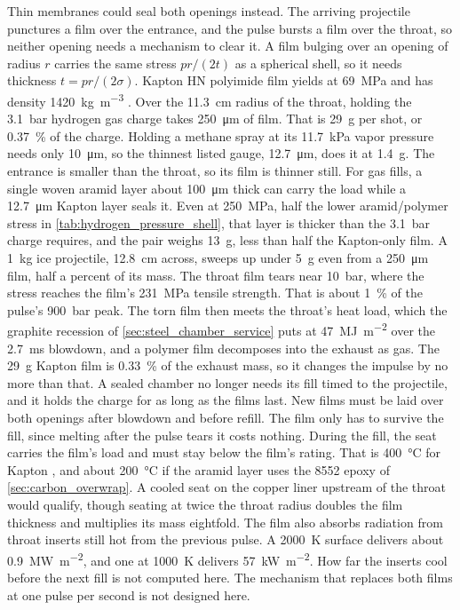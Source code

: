 \documentclass{article}
\begin{document}
Thin membranes could seal both openings instead. The arriving projectile punctures a film over the entrance, and the pulse bursts a film over the throat, so neither opening needs a mechanism to clear it. A film bulging over an opening of radius $r$ carries the same stress $pr/(2t)$ as a spherical shell, so it needs thickness $t=pr/(2\sigma)$. Kapton HN polyimide film yields at \SI{69}{\mega\pascal} and has density \SI{1420}{\kilogram\per\cubic\meter} \cite{dupont_kapton_hn_datasheet}. Over the \SI{11.3}{\centi\meter} radius of the throat, holding the \SI{3.1}{\bar} hydrogen gas charge takes \SI{250}{\micro\meter} of film. That is \SI{29}{\gram} per shot, or \SI{0.37}{\percent} of the charge. Holding a methane spray at its \SI{11.7}{\kilo\pascal} vapor pressure needs only \SI{10}{\micro\meter}, so the thinnest listed gauge, \SI{12.7}{\micro\meter}, does it at \SI{1.4}{\gram}. The entrance is smaller than the throat, so its film is thinner still. For gas fills, a single woven aramid layer about \SI{100}{\micro\meter} thick can carry the load while a \SI{12.7}{\micro\meter} Kapton layer seals it. Even at \SI{250}{\mega\pascal}, half the lower aramid/polymer stress in \autoref{tab:hydrogen_pressure_shell}, that layer is thicker than the \SI{3.1}{\bar} charge requires, and the pair weighs \SI{13}{\gram}, less than half the Kapton-only film. A \SI{1}{\kilogram} ice projectile, \SI{12.8}{\centi\meter} across, sweeps up under \SI{5}{\gram} even from a \SI{250}{\micro\meter} film, half a percent of its mass. The throat film tears near \SI{10}{\bar}, where the stress reaches the film's \SI{231}{\mega\pascal} tensile strength. That is about \SI{1}{\percent} of the pulse's \SI{900}{\bar} peak. The torn film then meets the throat's heat load, which the graphite recession of \autoref{sec:steel_chamber_service} puts at \SI{47}{\mega\joule\per\square\meter} over the \SI{2.7}{\milli\second} blowdown, and a polymer film decomposes into the exhaust as gas. The \SI{29}{\gram} Kapton film is \SI{0.33}{\percent} of the exhaust mass, so it changes the impulse by no more than that. A sealed chamber no longer needs its fill timed to the projectile, and it holds the charge for as long as the films last. New films must be laid over both openings after blowdown and before refill. The film only has to survive the fill, since melting after the pulse tears it costs nothing. During the fill, the seat carries the film's load and must stay below the film's rating. That is \SI{400}{\celsius} for Kapton \cite{dupont_kapton_hn_datasheet}, and about \SI{200}{\celsius} if the aramid layer uses the 8552 epoxy of \autoref{sec:carbon_overwrap}. A cooled seat on the copper liner upstream of the throat would qualify, though seating at twice the throat radius doubles the film thickness and multiplies its mass eightfold. The film also absorbs radiation from throat inserts still hot from the previous pulse. A \SI{2000}{\kelvin} surface delivers about \SI{0.9}{\mega\watt\per\square\meter}, and one at \SI{1000}{\kelvin} delivers \SI{57}{\kilo\watt\per\square\meter}. How far the inserts cool before the next fill is not computed here. The mechanism that replaces both films at one pulse per second is not designed here.
\end{document}

